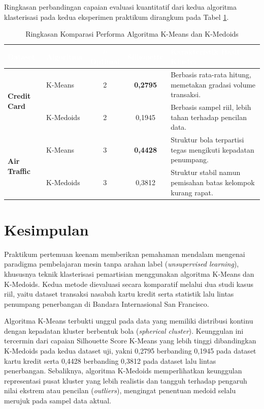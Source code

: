\documentclass[a4paper,oneside,12pt]{report}
\newcommand{\thead}[1]{\textcolor{white}{\textbf{#1}}}
\begin{document}
Ringkasan perbandingan capaian evaluasi kuantitatif dari kedua algoritma klasterisasi pada kedua eksperimen praktikum dirangkum pada Tabel \ref{tab:clustering-comp}.

\begin{table}[H]
\centering
\caption{Ringkasan Komparasi Performa Algoritma K-Means dan K-Medoids}
\label{tab:clustering-comp}
\renewcommand{\arraystretch}{1.25}
\small
\begin{tabularx}{\textwidth}{l l c c X}
\toprule
\rowcolor{tableheader}
\thead{Dataset} & \thead{Algoritma} & \thead{$k$ Optimal} & \thead{Silhouette} & \thead{Karakteristik Hasil Kluster} \\
\midrule
\multirow{2}{*}{\textbf{Credit Card}} & K-Means & 2 & \textbf{0,2795} & Berbasis rata-rata hitung, memetakan gradasi volume transaksi. \\
 & K-Medoids & 2 & 0,1945 & Berbasis sampel riil, lebih tahan terhadap pencilan data. \\
\midrule
\multirow{2}{*}{\textbf{Air Traffic}} & K-Means & 3 & \textbf{0,4428} & Struktur bola terpartisi tegas mengikuti kepadatan penumpang. \\
 & K-Medoids & 3 & 0,3812 & Struktur stabil namun pemisahan batas kelompok kurang rapat. \\
\bottomrule
\end{tabularx}
\end{table}

\clearpage

\chapter[Kesimpulan]{Kesimpulan}

Praktikum pertemuan keenam memberikan pemahaman mendalam mengenai paradigma pembelajaran mesin tanpa arahan label (\textit{unsupervised learning}), khususnya teknik klasterisasi pemartisian menggunakan algoritma K-Means dan K-Medoids. Kedua metode dievaluasi secara komparatif melalui dua studi kasus riil, yaitu dataset transaksi nasabah kartu kredit serta statistik lalu lintas penumpang penerbangan di Bandara Internasional San Francisco.

Algoritma K-Means terbukti unggul pada data yang memiliki distribusi kontinu dengan kepadatan kluster berbentuk bola (\textit{spherical cluster}). Keunggulan ini tercermin dari capaian Silhouette Score K-Means yang lebih tinggi dibandingkan K-Medoids pada kedua dataset uji, yakni 0,2795 berbanding 0,1945 pada dataset kartu kredit serta 0,4428 berbanding 0,3812 pada dataset lalu lintas penerbangan. Sebaliknya, algoritma K-Medoids memperlihatkan keunggulan representasi pusat kluster yang lebih realistis dan tangguh terhadap pengaruh nilai ekstrem atau pencilan (\textit{outliers}), mengingat penentuan medoid selalu merujuk pada sampel data aktual.
\end{document}
